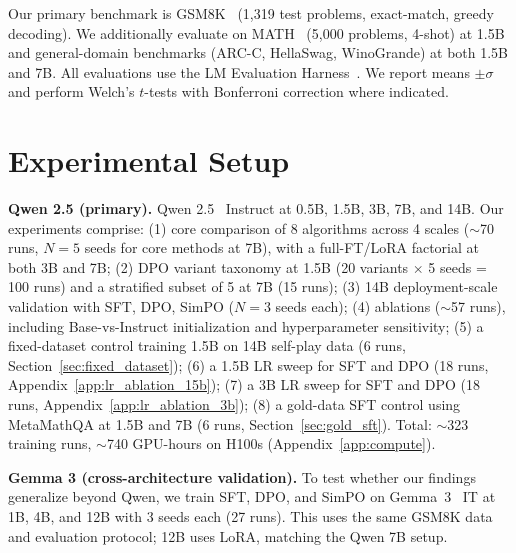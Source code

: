 \documentclass{article}
\begin{document}
Our primary benchmark is GSM8K~\citep{cobbe2021gsm8k} (1,319 test problems, exact-match, greedy decoding).
We additionally evaluate on MATH~\citep{hendrycks2021math} (5,000 problems, 4-shot) at 1.5B and general-domain benchmarks (ARC-C, HellaSwag, WinoGrande) at both 1.5B and 7B.
All evaluations use the LM Evaluation Harness~\citep{eval-harness}.
We report means $\pm \sigma$ and perform Welch's $t$-tests with Bonferroni correction where indicated.

\section{Experimental Setup}

\textbf{Qwen 2.5 (primary).} Qwen 2.5~\citep{qwen2025qwen25} Instruct at 0.5B, 1.5B, 3B, 7B, and 14B. Our experiments comprise: (1) core comparison of 8 algorithms across 4 scales ($\sim$70 runs, $N{=}5$ seeds for core methods at 7B), with a full-FT/LoRA factorial at both 3B and 7B; (2) DPO variant taxonomy at 1.5B (20 variants $\times$ 5 seeds = 100 runs) and a stratified subset of 5 at 7B (15 runs); (3) 14B deployment-scale validation with SFT, DPO, SimPO ($N{=}3$ seeds each); (4) ablations ($\sim$57 runs), including Base-vs-Instruct initialization and hyperparameter sensitivity; (5) a fixed-dataset control training 1.5B on 14B self-play data (6 runs, Section~\ref{sec:fixed_dataset}); (6) a 1.5B LR sweep for SFT and DPO (18 runs, Appendix~\ref{app:lr_ablation_15b}); (7) a 3B LR sweep for SFT and DPO (18 runs, Appendix~\ref{app:lr_ablation_3b}); (8) a gold-data SFT control using MetaMathQA at 1.5B and 7B (6 runs, Section~\ref{sec:gold_sft}). Total: $\sim$323 training runs, $\sim$740 GPU-hours on H100s (Appendix~\ref{app:compute}).

\textbf{Gemma 3 (cross-architecture validation).} To test whether our findings generalize beyond Qwen, we train SFT, DPO, and SimPO on Gemma~3~\citep{gemma3_2025} IT at 1B, 4B, and 12B with 3 seeds each (27 runs). This uses the same GSM8K data and evaluation protocol; 12B uses LoRA, matching the Qwen 7B setup.
\end{document}
